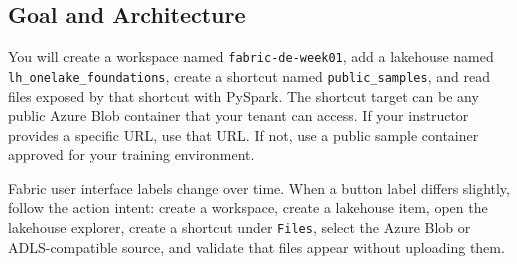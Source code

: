 \subsection{Goal and Architecture}
You will create a workspace named \texttt{fabric-de-week01}, add a lakehouse named \texttt{lh\_onelake\_foundations}, create a shortcut named \texttt{public\_samples}, and read files exposed by that shortcut with PySpark. The shortcut target can be any public Azure Blob container that your tenant can access. If your instructor provides a specific URL, use that URL. If not, use a public sample container approved for your training environment.

\begin{notebox}
Fabric user interface labels change over time. When a button label differs slightly, follow the action intent: create a workspace, create a lakehouse item, open the lakehouse explorer, create a shortcut under \texttt{Files}, select the Azure Blob or ADLS-compatible source, and validate that files appear without uploading them.
\end{notebox}

